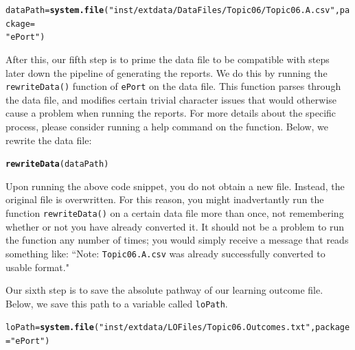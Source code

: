 \documentclass[11pt,a4paper,oldfontcommands,openany]{memoir}
\makeatletter
\newcommand{\hlstr}[1]{\textcolor[rgb]{0.192,0.494,0.8}{#1}}%
\newcommand{\hlstd}[1]{\textcolor[rgb]{0.345,0.345,0.345}{#1}}%
\newcommand{\hlkwb}[1]{\textcolor[rgb]{0.69,0.353,0.396}{#1}}%
\newcommand{\hlkwc}[1]{\textcolor[rgb]{0.333,0.667,0.333}{#1}}%
\newcommand{\hlkwd}[1]{\textcolor[rgb]{0.737,0.353,0.396}{\textbf{#1}}}%
\newenvironment{kframe}{%
 \def\at@end@of@kframe{}%
 \ifinner\ifhmode%
  \def\at@end@of@kframe{\end{minipage}}%
  \begin{minipage}{\columnwidth}%
 \fi\fi%
 \def\FrameCommand##1{\hskip\@totalleftmargin \hskip-\fboxsep
 \colorbox{shadecolor}{##1}\hskip-\fboxsep
     \hskip-\linewidth \hskip-\@totalleftmargin \hskip\columnwidth}%
 \MakeFramed {\advance\hsize-\width
   \@totalleftmargin\z@ \linewidth\hsize
   \@setminipage}}%
 {\par\unskip\endMakeFramed%
 \at@end@of@kframe}
\newenvironment{knitrout}{}{} %
\numberwithin{equation}{section} %
\makeatother
\begin{document}
\begin{knitrout}
\color{fgcolor}\begin{kframe}
\begin{alltt}
\hlstd{dataPath} \hlkwb{=} \hlkwd{system.file}\hlstd{(}\hlstr{"inst/extdata/DataFiles/Topic06/Topic06.A.csv"}\hlstd{,} \hlkwc{package} \hlstd{=}
  \hlstr{"ePort"}\hlstd{)}
\end{alltt}
\end{kframe}
\end{knitrout}

After this, our fifth step is to prime the data file to be compatible with steps later down the pipeline of generating the reports. We do this by running the \texttt{rewriteData()} function of \texttt{ePort} on the data file. This function parses through the data file, and modifies certain trivial character issues that would otherwise cause a problem when running the reports. For more details about the specific process, please consider running a help command on the function. Below, we rewrite the data file: \\

\begin{knitrout}
\color{fgcolor}\begin{kframe}
\begin{alltt}
\hlkwd{rewriteData}\hlstd{(dataPath)}
\end{alltt}
\end{kframe}
\end{knitrout}

Upon running the above code snippet, you do not obtain a new file. Instead, the original file is overwritten. For this reason, you might inadvertantly run the function \texttt{rewriteData()} on a certain data file more than once, not remembering whether or not you have already converted it. It should not be a problem to run the function any number of times; you would simply receive a message that reads something like: ``Note: \texttt{Topic06.A.csv} was already successfully converted to usable format."

Our sixth step is to save the absolute pathway of our learning outcome file. Below, we save this path to a variable called \texttt{loPath}. \\

\begin{knitrout}
\color{fgcolor}\begin{kframe}
\begin{alltt}
\hlstd{loPath} \hlkwb{=} \hlkwd{system.file}\hlstd{(}\hlstr{"inst/extdata/LOFiles/Topic06.Outcomes.txt"}\hlstd{,} \hlkwc{package} \hlstd{=} \hlstr{"ePort"}\hlstd{)}
\end{alltt}
\end{kframe}
\end{knitrout}
\end{document}
